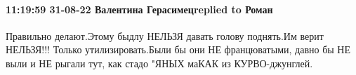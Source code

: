  
 
 
 
 

\paragraph{11:19:59 31-08-22 Валентина Герасимецreplied to Роман}

Правильно делают.Этому быдлу НЕЛЬЗЯ давать голову поднять.Им верит НЕЛЬЗЯ!!!
Только утилизировать.Были бы они НЕ францюватыми, давно бы НЕ выли и НЕ рыгали
тут, как стадо "ЯНЫХ маКАК из КУРВО-джунглей.
